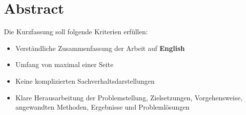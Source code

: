 \chapter{Abstract}

Die Kurzfassung soll folgende Kriterien erfüllen:
\begin{itemize}
	\item Verständliche Zusammenfassung der Arbeit auf \textbf{English}
	\item Umfang von maximal einer Seite
	\item Keine komplizierten Sachverhaltsdarstellungen
	\item Klare Herausarbeitung der Problemstellung, Zielsetzungen, Vorgehensweise, angewandten Methoden, Ergebnisse und Problemlösungen
\end{itemize}
